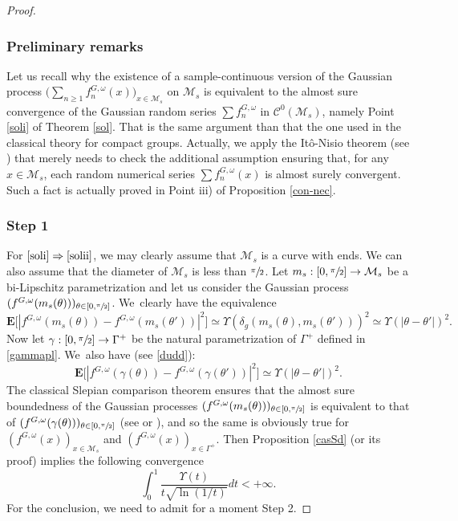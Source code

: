 \documentclass[11pt]{article}
\newcommand{\Subsubsection}{\subsubsection}
\newcommand{\skpt}{\smallskip}
\theoremstyle{theorem}
\theoremstyle{definition}
\newcommand\E{\mathbf{E}}
\newcommand\CC{\mathcal{C}}
\begin{document}
\skpt
\begin{proof}\vspace*{-.5\baselineskip}
\subsubsection*{Preliminary remarks}
Let us recall why the existence of a sample-continuous version of the Gaussian process $\bigl(\sum_{n\geq 1}f_n^{G,\omega}(x)\bigr)_{x\in \mathcal{M}_s}$ on $\mathcal{M}_s$ is equivalent to the almost sure convergence of the Gaussian random series $\sum f_n^{G,\omega}$ in $\CC^0(\mathcal{M}_s)$, namely Point \eqref{soli} of Theorem \ref{sol}. That is the same argument than that the one used in the classical theory for compact groups. Actually, we apply the Itô-Nisio theorem (see \cite[p.\,238]{queff2}) that merely needs to check the additional assumption ensuring that, for any $x\in \mathcal{M}_s$, each random numerical series $\sum f_n^{G,\omega}(x)$ is almost surely convergent. Such a fact is actually proved in Point iii) of Proposition \ref{con-nec}.

\Subsubsection*{Step 1}
 For $\eqref{soli}\Rightarrow\eqref{solii}$, we may clearly assume that $\mathcal{M}_s$ is a curve with ends. We can also assume that the diameter of $\mathcal{M}_s$ is less than $\sfrac{\pi}{2}$. Let $m_s: [0,\sfrac{\pi}{2}]\to \mathcal{M}_s$ be a bi-Lipschitz parametrization and let us consider the Gaussian process $(f^{G,\omega}(m_s(\theta)))_{\theta \in [0,\sfrac{\pi}{2}]}$. We~clearly have the equivalence
\begin{equation*}
\E\bigl[|f^{G,\omega}(m_s(\theta))-f^{G,\omega}(m_s(\theta'))|^2\bigr]\simeq \Upsilon(\delta_g(m_s(\theta),m_s(\theta')))^2\simeq \Upsilon(|\theta-\theta'|)^2.
\end{equation*}
Now let $\gamma:[0,\sfrac{\pi}{2}]\to \Gamma^{+}$ be the natural parametrization of $\Gamma^{+}$ defined in \eqref{gammapl}. We~also have (see \eqref{dudd}):
\begin{equation}\label{defSS}
\E\bigl[|f^{G,\omega}(\gamma(\theta))-f^{G,\omega}(\gamma(\theta'))|^2\bigr]\simeq \Upsilon(|\theta-\theta'|)^2.
\end{equation}
The classical Slepian comparison theorem ensures that the almost sure boundedness of the Gaussian processes $(f^{G,\omega}(m_s(\theta)))_{\theta \in [0,\sfrac{\pi}{2}]}$ is equivalent to that of
$(f^{G,\omega}(\gamma(\theta)))_{\theta\in [0,\sfrac{\pi}{2}]}$ (see \cite[Cor.\,3.14]{ledoux} or \cite[p.\,73]{queff2}), and so the same is obviously true for $(f^{G,\omega}(x))_{x\in \mathcal{M}_s}$ and $(f^{G,\omega}(x))_{x\in \Gamma^+}$. Then Proposition \ref{casSd} (or its proof) implies the following convergence
\begin{equation}\label{uup}
\int_{0}^1 \frac{\Upsilon(t)}{t\sqrt{\ln(1/t)}}dt <+\infty.
\end{equation}
For the conclusion, we need to admit for a moment Step 2.


\end{proof}
\end{document}
